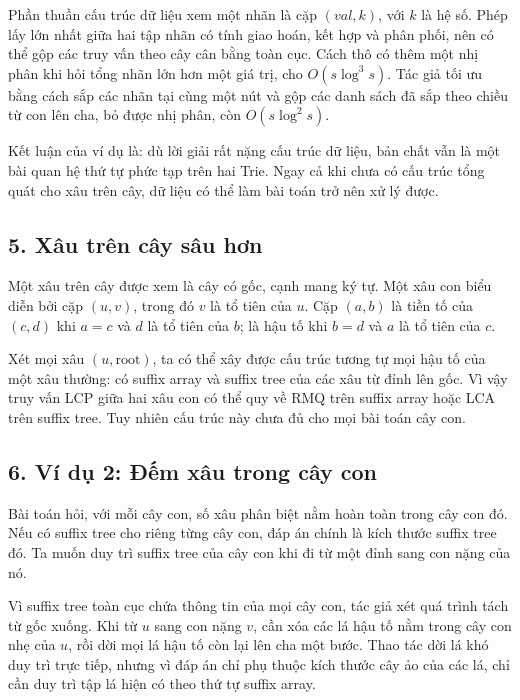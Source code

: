\documentclass[11pt]{article}
\begin{document}
Phần thuần cấu trúc dữ liệu xem một nhãn là cặp \((val,k)\), với \(k\) là hệ
số. Phép lấy lớn nhất giữa hai tập nhãn có tính giao hoán, kết hợp và phân
phối, nên có thể gộp các truy vấn theo cây cân bằng toàn cục. Cách thô có
thêm một nhị phân khi hỏi tổng nhãn lớn hơn một giá trị, cho \(O(s\log^3 s)\).
Tác giả tối ưu bằng cách sắp các nhãn tại cùng một nút và gộp các danh sách
đã sắp theo chiều từ con lên cha, bỏ được nhị phân, còn \(O(s\log^2 s)\).

Kết luận của ví dụ là: dù lời giải rất nặng cấu trúc dữ liệu, bản chất vẫn là
một bài quan hệ thứ tự phức tạp trên hai Trie. Ngay cả khi chưa có cấu trúc
tổng quát cho xâu trên cây, dữ liệu có thể làm bài toán trở nên xử lý được.

\subsection*{5. Xâu trên cây sâu hơn}

Một xâu trên cây được xem là cây có gốc, cạnh mang ký tự. Một xâu con biểu
diễn bởi cặp \((u,v)\), trong đó \(v\) là tổ tiên của \(u\). Cặp \((a,b)\) là
tiền tố của \((c,d)\) khi \(a=c\) và \(d\) là tổ tiên của \(b\); là hậu tố khi
\(b=d\) và \(a\) là tổ tiên của \(c\).

Xét mọi xâu \((u,\mathrm{root})\), ta có thể xây được cấu trúc tương tự mọi
hậu tố của một xâu thường: có suffix array và suffix tree của các xâu từ đỉnh
lên gốc. Vì vậy truy vấn LCP giữa hai xâu con có thể quy về RMQ trên suffix
array hoặc LCA trên suffix tree. Tuy nhiên cấu trúc này chưa đủ cho mọi bài
toán cây con.

\begin{center}
\end{center}

\subsection*{6. Ví dụ 2: Đếm xâu trong cây con}

Bài toán hỏi, với mỗi cây con, số xâu phân biệt nằm hoàn toàn trong cây con
đó. Nếu có suffix tree cho riêng từng cây con, đáp án chính là kích thước
suffix tree đó. Ta muốn duy trì suffix tree của cây con khi đi từ một đỉnh
sang con nặng của nó.

Vì suffix tree toàn cục chứa thông tin của mọi cây con, tác giả xét quá trình
tách từ gốc xuống. Khi từ \(u\) sang con nặng \(v\), cần xóa các lá hậu tố nằm
trong cây con nhẹ của \(u\), rồi dời mọi lá hậu tố còn lại lên cha một bước.
Thao tác dời lá khó duy trì trực tiếp, nhưng vì đáp án chỉ phụ thuộc kích
thước cây ảo của các lá, chỉ cần duy trì tập lá hiện có theo thứ tự suffix
array.
\end{document}
